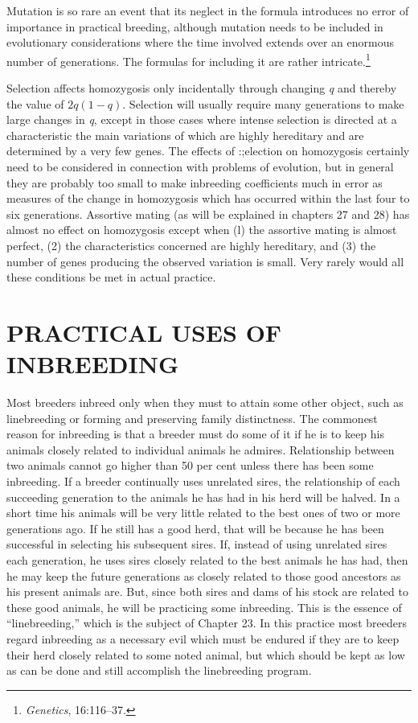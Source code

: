 Mutation is so rare an event that its neglect in the formula introduces
no error of importance in practical breeding, although mutation
needs to be included in evolutionary considerations where the time
involved extends over an enormous number of generations. The formulas
for including it are rather intricate.\footnote{\textit{Genetics}, 16:116--37.}

Selection affects homozygosis only incidentally through changing \textit{q}
and thereby the value of $2q (1 - q)$. Selection will usually require many
generations to make large changes in \textit{q}, except in those cases where
intense selection is directed at a characteristic the main variations of
which are highly hereditary and are determined by a very few genes.
The effects of :;election on homozygosis certainly need to be considered
in connection with problems of evolution, but in general they are
probably too small to make inbreeding coefficients much in error as
measures of the change in homozygosis which has occurred within the
last four to six generations. Assortive mating (as will be explained in
chapters 27 and 28) has almost no effect on homozygosis except when
(l) the assortive mating is almost perfect, (2) the characteristics concerned
are highly hereditary, and (3) the number of genes producing the
observed variation is small. Very rarely would all these conditions be
met in actual practice.

\section*{PRACTICAL USES OF INBREEDING}

Most breeders inbreed only when they must to attain some other
object, such as linebreeding or forming and preserving family distinctness.
The commonest reason for inbreeding is that a breeder must do
some of it if he is to keep his animals closely related to individual animals
he admires. Relationship between two animals cannot go higher
than 50 per cent unless there has been some inbreeding. If a breeder
continually uses unrelated sires, the relationship of each succeeding
generation to the animals he has had in his herd will be halved. In a
short time his animals will be very little related to the best ones of two
or more generations ago. If he still has a good herd, that will be because
he has been successful in selecting his subsequent sires. If, instead of
using unrelated sires each generation, he uses sires closely related to the
best animals he has had, then he may keep the future generations as
closely related to those good ancestors as his present animals are. But,
since both sires and dams of his stock are related to these good animals,
he will be practicing some inbreeding. This is the essence of ``linebreeding,''
which is the subject of Chapter 23. In this practice most breeders
regard inbreeding as a necessary evil which must be endured if they are
to keep their herd closely related to some noted animal, but which
should be kept as low as can be done and still accomplish the linebreeding
program.

